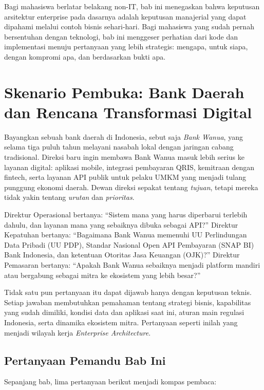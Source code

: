 Bagi mahasiswa berlatar belakang non-IT, bab ini menegaskan bahwa keputusan
arsitektur enterprise pada dasarnya adalah keputusan manajerial yang dapat
dipahami melalui contoh bisnis sehari-hari. Bagi mahasiswa yang sudah pernah
bersentuhan dengan teknologi, bab ini menggeser perhatian dari kode dan
implementasi menuju pertanyaan yang lebih strategis: mengapa, untuk siapa,
dengan kompromi apa, dan berdasarkan bukti apa.

\section{Skenario Pembuka: Bank Daerah dan Rencana Transformasi Digital}

Bayangkan sebuah bank daerah di Indonesia, sebut saja \emph{Bank Wanua}, yang
selama tiga puluh tahun melayani nasabah lokal dengan jaringan cabang
tradisional. Direksi baru ingin membawa Bank Wanua masuk lebih serius ke
layanan digital: aplikasi mobile, integrasi pembayaran QRIS, kemitraan dengan
fintech,
serta layanan API publik untuk pelaku UMKM yang menjadi tulang punggung
ekonomi daerah. Dewan direksi sepakat tentang \emph{tujuan}, tetapi mereka
tidak yakin tentang \emph{urutan} dan \emph{prioritas}.

Direktur Operasional bertanya: ``Sistem mana yang harus diperbarui terlebih
dahulu, dan layanan mana yang sebaiknya dibuka sebagai API?'' Direktur
Kepatuhan bertanya: ``Bagaimana Bank Wanua memenuhi UU Perlindungan Data
Pribadi (UU PDP), Standar Nasional Open API Pembayaran (SNAP BI) Bank
Indonesia, dan ketentuan Otoritas Jasa Keuangan (OJK)?'' Direktur Pemasaran
bertanya: ``Apakah Bank Wanua sebaiknya menjadi platform mandiri atau
bergabung sebagai mitra ke ekosistem yang lebih besar?''

Tidak satu pun pertanyaan itu dapat dijawab hanya dengan keputusan teknis.
Setiap jawaban membutuhkan pemahaman tentang strategi bisnis, kapabilitas yang
sudah dimiliki, kondisi data dan aplikasi saat ini, aturan main regulasi
Indonesia, serta dinamika ekosistem mitra. Pertanyaan seperti inilah yang
menjadi wilayah kerja \emph{Enterprise Architecture}.

\subsection*{Pertanyaan Pemandu Bab Ini}

Sepanjang bab, lima pertanyaan berikut menjadi kompas pembaca:

